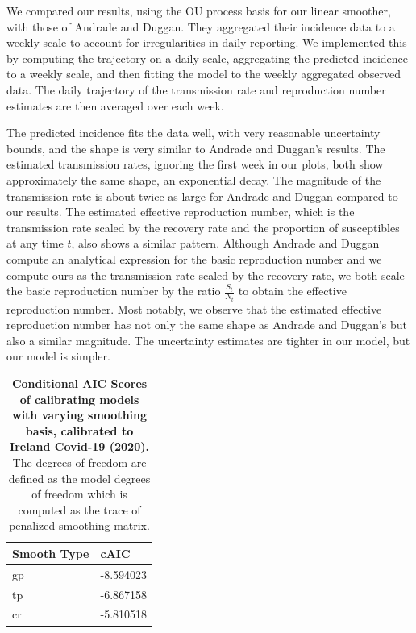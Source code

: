 \documentclass[
11pt, %
oneside, %
english, %
singlespacing, %
]{macthesis} %
\begin{document}
We compared our results, using the OU process basis for our linear smoother, with those of Andrade and Duggan. They aggregated their incidence data to a weekly scale to account for irregularities in daily reporting. We implemented this by computing the trajectory on a daily scale, aggregating the predicted incidence to a weekly scale, and then fitting the model to the weekly aggregated observed data. The daily trajectory of the transmission rate and reproduction number estimates are then averaged over each week.

The predicted incidence fits the data well, with very reasonable uncertainty bounds, and the shape is very similar to Andrade and Duggan's results. The estimated transmission rates, ignoring the first week in our plots, both show approximately the same shape, an exponential decay. The magnitude of the transmission rate is about twice as large for Andrade and Duggan compared to our results. The estimated effective reproduction number, which is the transmission rate scaled by the recovery rate and the proportion of susceptibles at any time \(t\), also shows a similar pattern. Although Andrade and Duggan compute an analytical expression for the basic reproduction number and we compute ours as the transmission rate scaled by the recovery rate, we both scale the basic reproduction number by the ratio \(\frac{S_t}{N_t}\) to obtain the effective reproduction number. Most notably, we observe that the estimated effective reproduction number has not only the same shape as Andrade and Duggan's but also a similar magnitude. The uncertainty estimates are tighter in our model, but our model is simpler.

\begin{table}[!h]
\centering
\caption{\label{tab:aic-table-ireland}\textbf{Conditional AIC Scores of calibrating models with varying smoothing basis, calibrated to Ireland Covid-19 (2020).} The degrees of freedom are defined as the model degrees of freedom which is computed as the trace of penalized smoothing matrix.}
\centering
\begin{tabular}[t]{ll}
\toprule
Smooth Type & cAIC\\
\midrule
gp & -8.594023\\
tp & -6.867158\\
cr & -5.810518\\
\bottomrule
\end{tabular}
\end{table}
\end{document}
